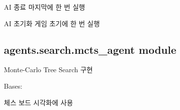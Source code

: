 \documentclass[letterpaper,10pt,english]{sphinxmanual}
\begin{document}
\begin{fulllineitems}

\begin{fulllineitems}
\label{\detokenize{agents.search:agents.search.abp_negamax_search_agent.ABPNegamaxSearchAgent.close}}
AI 종료
마지막에 한 번 실행

\end{fulllineitems}


\begin{fulllineitems}
\label{\detokenize{agents.search:agents.search.abp_negamax_search_agent.ABPNegamaxSearchAgent.negamax}}
\end{fulllineitems}


\begin{fulllineitems}
\label{\detokenize{agents.search:agents.search.abp_negamax_search_agent.ABPNegamaxSearchAgent.reset}}
AI 초기화
게임 초기에 한 번 실행

\end{fulllineitems}


\end{fulllineitems}



\subsection{agents.search.mcts\_agent module}
\label{\detokenize{agents.search:module-agents.search.mcts_agent}}\label{\detokenize{agents.search:agents-search-mcts-agent-module}}
Monte-Carlo Tree Search 구현

\begin{fulllineitems}
\label{\detokenize{agents.search:agents.search.mcts_agent.Arrow}}
Bases: {\hyperref[\detokenize{agents.search:agents.search.mcts_agent.Arrow}]{}}

체스 보드 시각화에 사용

\end{fulllineitems}
\end{document}
